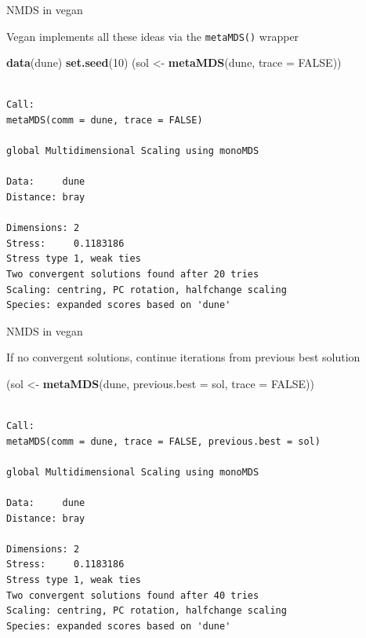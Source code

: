 \documentclass[10pt,ignorenonframetext,compress, aspectratio=169]{beamer}
\newenvironment{Shaded}{\begin{snugshade}}{\end{snugshade}}
\newcommand{\KeywordTok}[1]{\textcolor[rgb]{0.13,0.29,0.53}{\textbf{{#1}}}}
\newcommand{\DataTypeTok}[1]{\textcolor[rgb]{0.13,0.29,0.53}{{#1}}}
\newcommand{\DecValTok}[1]{\textcolor[rgb]{0.00,0.00,0.81}{{#1}}}
\newcommand{\StringTok}[1]{\textcolor[rgb]{0.31,0.60,0.02}{{#1}}}
\newcommand{\OtherTok}[1]{\textcolor[rgb]{0.56,0.35,0.01}{{#1}}}
\newcommand{\NormalTok}[1]{{#1}}
\begin{document}
\begin{frame}[fragile]{NMDS in vegan}

Vegan implements all these ideas via the \texttt{metaMDS()} wrapper

\begin{Shaded}
\begin{Highlighting}[]
\KeywordTok{data}\NormalTok{(dune)}
\KeywordTok{set.seed}\NormalTok{(}\DecValTok{10}\NormalTok{)}
\NormalTok{(sol <-}\StringTok{ }\KeywordTok{metaMDS}\NormalTok{(dune, }\DataTypeTok{trace =} \OtherTok{FALSE}\NormalTok{))}
\end{Highlighting}
\end{Shaded}

\begin{verbatim}

Call:
metaMDS(comm = dune, trace = FALSE) 

global Multidimensional Scaling using monoMDS

Data:     dune 
Distance: bray 

Dimensions: 2 
Stress:     0.1183186 
Stress type 1, weak ties
Two convergent solutions found after 20 tries
Scaling: centring, PC rotation, halfchange scaling 
Species: expanded scores based on 'dune' 
\end{verbatim}

\end{frame}

\begin{frame}[fragile]{NMDS in vegan}

If no convergent solutions, continue iterations from previous best
solution

\begin{Shaded}
\begin{Highlighting}[]
\NormalTok{(sol <-}\StringTok{ }\KeywordTok{metaMDS}\NormalTok{(dune, }\DataTypeTok{previous.best =} \NormalTok{sol, }\DataTypeTok{trace =} \OtherTok{FALSE}\NormalTok{))}
\end{Highlighting}
\end{Shaded}

\begin{verbatim}

Call:
metaMDS(comm = dune, trace = FALSE, previous.best = sol) 

global Multidimensional Scaling using monoMDS

Data:     dune 
Distance: bray 

Dimensions: 2 
Stress:     0.1183186 
Stress type 1, weak ties
Two convergent solutions found after 40 tries
Scaling: centring, PC rotation, halfchange scaling 
Species: expanded scores based on 'dune' 
\end{verbatim}

\end{frame}
\end{document}
